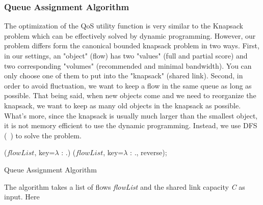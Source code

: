 \subsubsection{Queue Assignment Algorithm}
\label{sect:queueAssignAlgo}

The optimization of the QoS utility function is very similar to the Knapsack problem  which can be effectively solved by dynamic
programming. However, our problem differs form the canonical bounded knapsack problem in two ways. First, in our settings, an "object" (flow) has
two "values" (full and partial score) and two corresponding "volumes" (recommended and minimal bandwidth). You can only choose one of them to put
into the "knapsack" (shared link). Second, in order to avoid fluctuation, we want to keep a flow in the same queue as long as possible. That being
said, when new objects come and we need to reorganize the knapsack, we want to keep as many old objects in the knapsack as possible. What's more,
since the knapsack is usually much larger than the smallest object, it is not memory efficient to use the dynamic programming. Instead, we use
DFS (~) to solve the problem.

\begin{algorithm}
    

  
  \Sort($flowList$, key=$\lambda$ \X: \X.\Timestamp)\;
  \Sort($flowList$, key=$\lambda$ \X: \X.\Priority, reverse);



  \caption{Queue Assignment Algorithm}\label{alg:queueAssignAlgo}
\end{algorithm}

The algorithm takes a list of flows \emph{flowList} and the shared link capacity \emph{C} as input. Here
